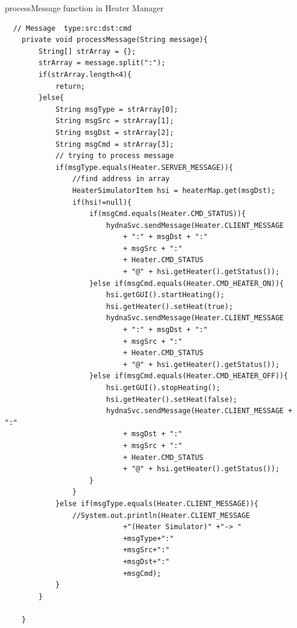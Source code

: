 \begin{algorithm}[h]
  \caption{processMessage function in Heater Manager}
  \label{code:heater_process_message}
  \begin{verbatim}
  // Message  type:src:dst:cmd
	private void processMessage(String message){
		String[] strArray = {};
		strArray = message.split(":");
		if(strArray.length<4){
			return;
		}else{
			String msgType = strArray[0];
			String msgSrc = strArray[1];
			String msgDst = strArray[2];
			String msgCmd = strArray[3];
			// trying to process message
			if(msgType.equals(Heater.SERVER_MESSAGE)){
				//find address in array
				HeaterSimulatorItem hsi = heaterMap.get(msgDst);
				if(hsi!=null){
					if(msgCmd.equals(Heater.CMD_STATUS)){
						hydnaSvc.sendMessage(Heater.CLIENT_MESSAGE 
							+ ":" + msgDst + ":" 
							+ msgSrc + ":" 
							+ Heater.CMD_STATUS 
							+ "@" + hsi.getHeater().getStatus());
					}else if(msgCmd.equals(Heater.CMD_HEATER_ON)){
						hsi.getGUI().startHeating();
						hsi.getHeater().setHeat(true);
						hydnaSvc.sendMessage(Heater.CLIENT_MESSAGE 
							+ ":" + msgDst + ":" 
							+ msgSrc + ":" 
							+ Heater.CMD_STATUS 
							+ "@" + hsi.getHeater().getStatus());
					}else if(msgCmd.equals(Heater.CMD_HEATER_OFF)){
						hsi.getGUI().stopHeating();
						hsi.getHeater().setHeat(false);
						hydnaSvc.sendMessage(Heater.CLIENT_MESSAGE + ":" 
							+ msgDst + ":" 
							+ msgSrc + ":" 
							+ Heater.CMD_STATUS 
							+ "@" + hsi.getHeater().getStatus());
					}
				}
			}else if(msgType.equals(Heater.CLIENT_MESSAGE)){
				//System.out.println(Heater.CLIENT_MESSAGE 
							+"(Heater Simulator)" +"-> " 
							+msgType+":"
							+msgSrc+":"
							+msgDst+":"
							+msgCmd);
			}
		}
		
	}
 \end{verbatim}
\end{algorithm}

